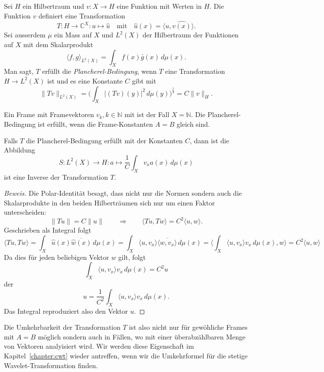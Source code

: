 \begin{definition}
Sei $H$ ein Hilbertraum und
$v\colon X\to H$ eine Funktion mit Werten in $H$.
Die Funktion $v$ definiert eine Transformation
\[
T\colon  H \to \mathbb C^X : u \mapsto \hat{u}
\quad\text{mit}\quad
\hat{u}(x) = \langle u,\hat{v(x)}\rangle.
\]
Sei ausserdem $\mu$ ein Mass auf $X$ und $L^2(X)$ der Hilbertraum
der Funktionen auf $X$ mit dem Skalarprodukt
\[
\langle f,g\rangle_{L^2(X)} = \int_X f(x) \bar{g}(x)\,d\mu(x).
\]
Man sagt, $T$ erfüllt die {\em Plancherel-Bedingung}, wenn $T$
eine Transformation $H\to L^2(X)$ ist und es eine Konstante $C$
gibt mit
\[
\| Tv \|_{L^2(X)}
=
\biggl(
\int_{X} |(Tv)(y)|^2 \, d\mu(y)
\biggr)^{\frac12}
=
C \|v\|_H.
\]
\end{definition}

Ein Frame mit Framevektoren $v_k, k\in\mathbb N$ mit
ist der Fall $X=\mathbb N$. Die Plancherel-Bedingung ist erfüllt, wenn
die Frame-Konstanten $A=B$ gleich sind.

\begin{satz}
Falls $T$ die Plancherel-Bedingung erfüllt mit der Konstanten $C$, dann ist
die Abbildung
\[
S
\colon
L^2(X) \to H
:
a \mapsto \frac{1}{C}\int_X v_x a(x) \,d\mu(x)
\]
ist eine Inverse der Transformation $T$.
\end{satz}

\begin{proof}[Beweis]
Die Polar-Identität besagt, dass nicht nur die Normen sondern auch die
Skalarprodukte in den beiden Hilberträumen sich nur um einen Faktor
unterscheiden:
\[
\| Tu \| = C \| u \|
\qquad\Rightarrow\qquad
\langle Tu,Tw\rangle = C^2 \langle u,w\rangle.
\]
Geschrieben als Integral folgt
\[
\langle Tu,Tw\rangle
=
\int_X \hat{u}(x) \overline{\hat{w}(x)} \,d\mu(x)
=
\int_X \langle u,v_x\rangle \overline{\langle w,v_x\rangle}\,d\mu(x)
=
\biggl\langle
\int_X \langle u,v_x\rangle v_x\,d\mu(x),
w
\biggr\rangle
=
C^2
\langle u,w\rangle
\]
Da dies für jeden beliebigen Vektor $w$ gilt, folgt 
\[
\int_X \langle u,v_x\rangle v_x\,d\mu(x) = C^2 u
\]
der
\[
u = \frac{1}{C^2}\int_X \langle u,v_x\rangle v_x\,d\mu(x).
\]
Das Integral reproduziert also den Vektor $u$.
\end{proof}

Die Umkehrbarkeit der Transformation $T$ ist also nicht nur für gewöhliche
Frames mit $A=B$ möglich sondern auch in Fällen, wo mit einer überabzählbaren
Menge von Vektoren analyisiert wird.
Wir werden diese Eigenschaft im Kapitel~\ref{chapter:cwt} wieder antreffen,
wenn wir die Umkehrformel für die stetige Wavelet-Transformation finden.





